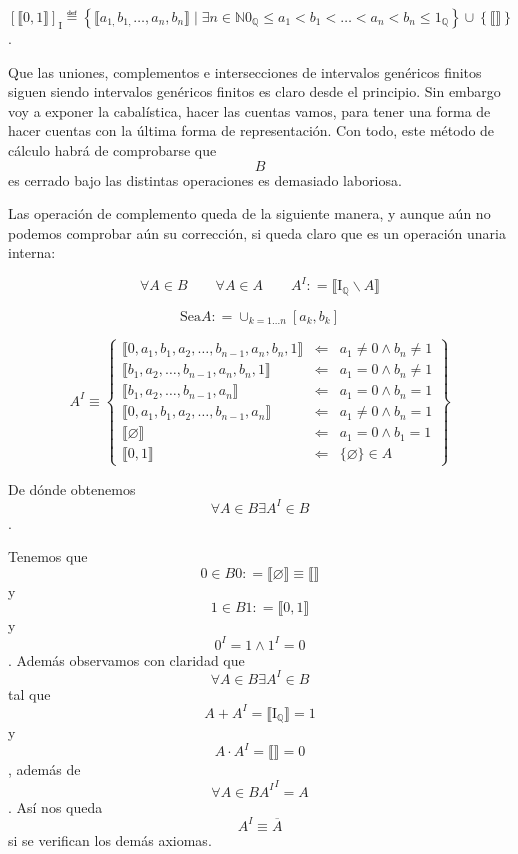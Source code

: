 \begin{enumerate}
\begin{enumerate}
\begin{enumerate}
      \[\left\lbrack {⟦0,1⟧} \right\rbrack_{\mathbf{\mathrm{I}}} ≝ {\left\{ {{⟦{a_{1,}b_{1,}\ldots,a_{n},b_{n}}⟧} \mid {\exists{n \in \mathbb{N}}{{{{{{0_{\mathbb{Q}} \leq a_{1}} < b_{1}} < \ldots} < a_{n}} < b_{n}} \leq 1_{\mathbb{Q}}}}} \right\} \cup \left\{ {⟦⟧} \right\}}\].
    \end{enumerate}
  \end{enumerate}

  Que las uniones, complementos e intersecciones de intervalos genéricos
  finitos siguen siendo intervalos genéricos finitos es claro desde el
  principio. Sin embargo voy a exponer la cabalística, hacer las cuentas
  vamos, para tener una forma de hacer cuentas con la última forma de
  representación. Con todo, este método de cálculo habrá de comprobarse
  que \[B\] es cerrado bajo las distintas operaciones es demasiado
  laboriosa.

  Las operación de complemento queda de la siguiente manera, y aunque
  aún no podemos comprobar aún su corrección, si queda claro que es un
  operación unaria interna:

  \[\forall{A \in B}\qquad\forall{A \in A}\qquad A^{I}{: = {⟦{\mathbf{\mathrm{I}}_{\mathbb{Q}} \smallsetminus A}⟧}}\]

  \[\text{Sea}A{: = \cup_{{k = 1.}..n}}\left\lbrack {a_{k},b_{k}} \right\rbrack\]

  \[A^{I} \equiv \begin{Bmatrix}
  {⟦{0,a_{1},b_{1},a_{2},\ldots,b_{n - 1},a_{n},b_{n},1}⟧} & \Leftarrow & {a_{1} \neq {0 \land b_{n}} \neq 1} \\
  {⟦{b_{1},a_{2},\ldots,b_{n - 1},a_{n},b_{n},1}⟧} & \Leftarrow & {a_{1} = {0 \land b_{n}} \neq 1} \\
  {⟦{b_{1},a_{2},\ldots,b_{n - 1},a_{n}}⟧} & \Leftarrow & {a_{1} = {0 \land b_{n}} = 1} \\
  {⟦{0,a_{1},b_{1},a_{2},\ldots,b_{n - 1},a_{n}}⟧} & \Leftarrow & {a_{1} \neq {0 \land b_{n}} = 1} \\
  {⟦\varnothing ⟧} & \Leftarrow & {a_{1} = {0 \land b_{1}} = 1} \\
  {⟦0,1⟧} & \Leftarrow & {{\{\varnothing\}} \in A}
  \end{Bmatrix}\]

  De dónde obtenemos\[\forall{A \in B}\exists{A^{I} \in B}\].

  Tenemos que \[{0 \in B}0{{: = {⟦\varnothing ⟧}} \equiv {⟦⟧}}\]y
  \[{1 \in B}1{: = {⟦0,1⟧}}\]y \[{0^{I} = {1 \land 1^{I}}} = 0\]. Además
  observamos con claridad que
  \[\forall{A \in B}\exists{A^{I} \in B}\]tal
  que\[{{A + A^{I}} = {⟦\mathbf{\mathrm{I}}_{\mathbb{Q}}⟧}} = 1\]y
  \[{{A \cdot A^{I}} = {⟦⟧}} = 0\], además de
  \[\forall{A \in B}{{A^{I}}^{I} = A}\]. Así nos queda
  \[A^{I} \equiv \overline{A}\]si se verifican los demás axiomas.


\end{enumerate}

